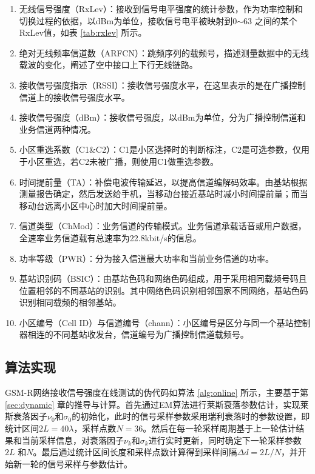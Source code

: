 \begin{enumerate}
  \item 无线信号强度（RxLev）：接收到信号电平强度的统计参数，作为功率控制和切换过程的依据，以dBm为单位，接收信号电平被映射到0$\sim$63 之间的某个RxLev值，如表 \ref{tab:rxlev} 所示。
  \item 绝对无线频率信道数（ARFCN）：跳频序列的载频号，描述测量数据中的无线载波的变化，阐述了空中接口上下行无线链路。
  \item 接收信号强度指示（RSSI）：接收信号强度水平，在这里表示的是在广播控制信道上的接收信号强度水平。
  \item 接收信号强度（dBm）：接收信号强度，以dBm为单位，分为广播控制信道和业务信道两种情况。
  \item 小区重选系数（C1\&C2）：C1是小区选择时的判断标注，C2是可选参数，仅用于小区重选，若C2未被广播，则使用C1做重选参数。
  \item 时间提前量（TA）：补偿电波传输延迟，以提高信道编解码效率。由基站根据测量报告确定，然后发送给手机，当移动台接近基站时减小时间提前量；而当移动台远离小区中心时加大时间提前量。
  \item 信道类型（ChMod）：业务信道的传输模式。业务信道承载话音或用户数据，全速率业务信道载有总速率为22.8kbit/s的信息。
  \item 功率等级（PWR）：分为接入信道最大功率和当前业务信道的功率。
  \item 基站识别码（BSIC）：由基站色码和网络色码组成，用于采用相同载频号码且位置相邻的不同基站的识别。其中网络色码识别相邻国家不同网络，基站色码识别相同载频的相邻基站。
  \item 小区编号（Cell ID）与信道编号（chann）：小区编号是区分与同一个基站控制器相连的不同基站收发台，信道编号为广播控制信道载频号。
\end{enumerate}

\subsection{算法实现}
\label{sec:alggsmr}

GSM-R网络接收信号强度在线测试的伪代码如算法 \ref{alg:online} 所示，主要基于第 \ref{sec:dynamic} 章的推导与计算。首先通过EM算法进行莱斯衰落参数估计，实现莱斯衰落因子$\nu_0$和$\sigma_0$的初始化，此时的信号采样参数采用瑞利衰落时的参数设置，即统计区间$2L=40\lambda$，采样点数$N=36$。然后在每一轮采样周期基于上一轮估计结果和当前采样信息，对衰落因子$\nu_k$和$\sigma_k$进行实时更新，同时确定下一轮采样参数$2L$ 和$N$。最后通过统计区间长度和采样点数计算得到采样间隔$\Delta d=2L/N$，并开始新一轮的信号采样与参数估计。

